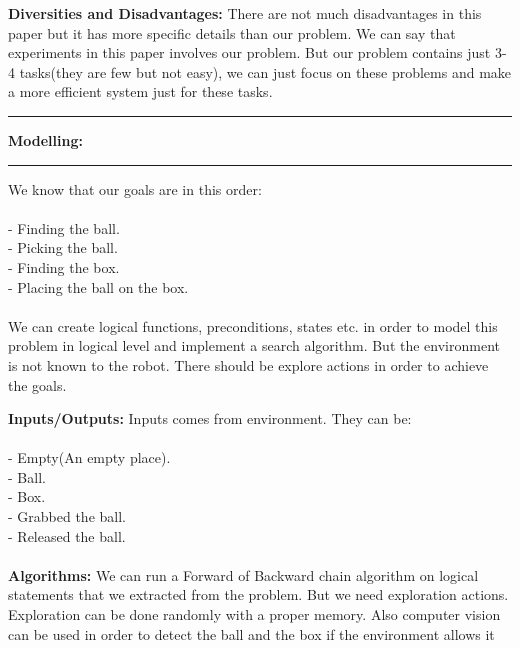 \documentclass[11pt]{article}
\newcommand\question[2]{\vspace{.25in}\hrule\textbf{#1: #2}\vspace{.5em}\hrule\vspace{.10in}}
\renewcommand\part[1]{\vspace{.10in}\textbf{#1}}
\begin{document}
	\part{Diversities and Disadvantages:} There are not much disadvantages in this paper but it has more specific details than our problem. We can say that experiments in this paper involves our problem. But our problem contains just 3-4 tasks(they are few but not easy), we can just focus on these problems and make a more efficient system just for these tasks.
	
	\clearpage
	
	\question{Modelling}{}
	We know that our goals are in this order:\\ \ \\
	
	- Finding the ball.\\
	- Picking the ball.\\
	- Finding the box.\\
	- Placing the ball on the box.\\ \ \\
	
	We can create logical functions, preconditions, states etc. in order to model this problem in logical level and implement a search algorithm. But the environment is not known to the robot. There should be explore actions in order to achieve the goals.
	
	\part{Inputs/Outputs:} Inputs comes from environment. They can be:\\ \ \\
	- Empty(An empty place).\\
	- Ball.\\
	- Box.\\
	- Grabbed the ball.\\
	- Released the ball.\\ \ \\
	
	\part{Algorithms:} We can run a Forward of Backward chain algorithm on logical statements that we extracted from the problem. But we need exploration actions. Exploration can be done randomly with a proper memory. Also computer vision can be used in order to detect the ball and the box if the environment allows it\\ \ \\
	
\end{document}
